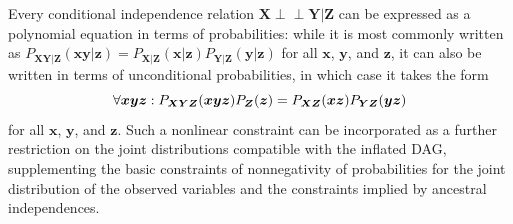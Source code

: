 \documentclass[aps,english,superscriptaddress,onecolumn,twoside,longbibliography,pra,floatfix,fleqn,nofootinbib]{revtex4-1}%
\newcommand*{\tblue}[1]{{\color{MidnightBlue}{\textbf{#1}}}}
\theoremstyle{definition}
\newcommand{\p}[2][]{{P_{#1}}\parenths{#2}}
\newcommand{\indep}{\perp\!\!\!\!\perp} %
\DeclarePairedDelimiter{\parenths}{\lparen}{\rparen}
\begin{document}

Every conditional independence relation $\bm{X}\indep\bm{Y}|\bm{Z}$ can be expressed as a polynomial equation in terms of probabilities: while it is most commonly written as $P_{\bm{X}\bm{Y}|\bm{Z}}(\bm{x}\bm{y}|\bm{z})=P_{\bm{X}|\bm{Z}}(\bm{x}|\bm{z})P_{\bm{Y}|\bm{Z}}(\bm{y}|\bm{z})$ for all $\bm{x}$, $\bm{y}$, and $\bm{z}$, it can also be written in terms of unconditional probabilities, in which case it takes the form
\[
\forall{\bm{x} \bm{y} \bm{z}}: \p[\bm{X}\bm{Y}\bm{Z}]{\bm{x}\bm{y}\bm{z}}\p[\bm{Z}]{\bm{z}}=\p[\bm{X}\bm{Z}]{\bm{x}\bm{z}}\p[\bm{Y}\bm{Z}]{\bm{y}\bm{z}}
\]
for all $\bm{x}$, $\bm{y}$, and $\bm{z}$. Such a nonlinear constraint can be incorporated as a further restriction on the joint distributions compatible with the inflated DAG, supplementing the basic constraints of nonnegativity of probabilities for the joint distribution of the observed variables and the constraints implied by ancestral independences.
\end{document}
